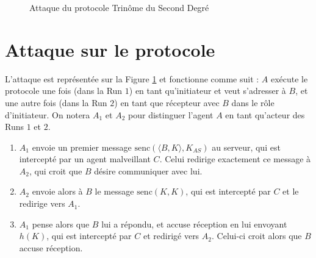 \documentclass[a4paper,10pt]{article}
\begin{document}
\begin{figure}
\begin{center}
\end{center}
\caption{Attaque du protocole Trinôme du Second Degré}
\label{fig1}
\end{figure}




\section{Attaque sur le protocole}
L'attaque est représentée sur la Figure \ref{fig1} et fonctionne comme suit : $A$ exécute le protocole une fois (dans la Run $1$) en tant qu'initiateur et veut s'adresser à $B$, et une autre fois (dans la Run $2$) en tant que récepteur avec $B$ dans le rôle d'initiateur. On notera $A_1$ et $A_2$ pour distinguer l'agent $A$ en tant qu'acteur des Runs $1$ et $2$.\\
\begin{enumerate}
\item $A_1$ envoie un premier message $\textrm{senc}(\langle B,K \rangle, K_{AS})$ au serveur, qui est intercepté par un agent malveillant $C$. Celui redirige exactement ce message à $A_2$, qui croit que $B$ désire communiquer avec lui. 
\item $A_2$ envoie alors à $B$ le message $\textrm{senc}(K,K)$, qui est intercepté par $C$ et le redirige vers $A_1$.
\item $A_1$ pense alors que $B$ lui a répondu, et accuse réception en lui envoyant $h(K)$, qui est intercepté par $C$ et redirigé vers $A_2$. Celui-ci croit alors que $B$ accuse réception.
\end{enumerate}
\end{document}
